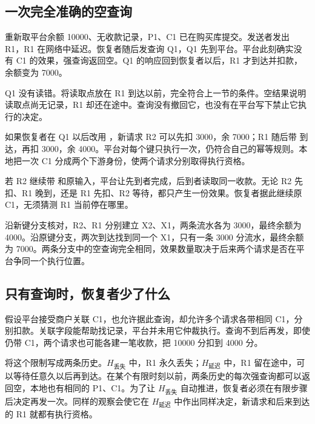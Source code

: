 \subsection*{一次完全准确的空查询}

重新取平台余额 10000、无收款记录，P1、C1 已在购买库提交。发送者发出 R1，R1 在网络中延迟。恢复者随后发查询 Q1，Q1 先到平台。平台此刻确实没有 C1 的效果，强查询返回空。Q1 的响应回到恢复者以后，R1 才到达并扣款，余额变为 7000。


Q1 没有读错。将读取点放在 R1 到达以前，完全符合上一节的条件。空结果说明读取点尚无记录，R1 却还在途中。查询没有撤回它，也没有在平台写下禁止它执行的决定。

如果恢复者在 Q1 以后改用 ，新请求 R2 可以先扣 3000，余 7000；R1 随后带  到达，再扣 3000，余 4000。平台对每个键只执行一次，仍符合自己的幂等规则。本地把一次 C1 分成两个下游身份，使两个请求分别取得执行资格。

若 R2 继续带  和原输入，平台让先到者完成，后到者读取同一收款。无论 R2 先扣、R1 晚到，还是 R1 先扣、R2 等待，都只产生一份效果。恢复者据此继续原 C1，无须猜测 R1 当前停在哪里。

沿新键分支核对，R2、R1 分别建立 X2、X1，两条流水各为 3000，最终余额为 4000。沿原键分支，两次到达找到同一个 X1，只有一条 3000 分流水，最终余额为 7000。两条分支中的空查询完全相同，效果数量取决于后来两个请求是否在平台争同一个执行位置。

\subsection*{只有查询时，恢复者少了什么}

假设平台接受商户关联 C1，也允许据此查询，却允许多个请求各带相同 C1，分别扣款。关联字段能帮助找记录，平台并未用它仲裁执行。查询不到后再发，即使仍带 C1，两个请求也可能各建一笔收款，把 10000 分扣到 4000 分。

将这个限制写成两条历史。\(H_{\text{丢失}}\) 中，R1 永久丢失；\(H_{\text{延迟}}\) 中，R1 留在途中，可以等待任意久以后再到达。在某个有限时刻以前，两条历史的每次强查询都可以返回空，本地也有相同的 P1、C1。为了让 \(H_{\text{丢失}}\) 自动推进，恢复者必须在有限步骤后决定再发一次。同样的观察会使它在 \(H_{\text{延迟}}\) 中作出同样决定，新请求和后来到达的 R1 就都有执行资格。


